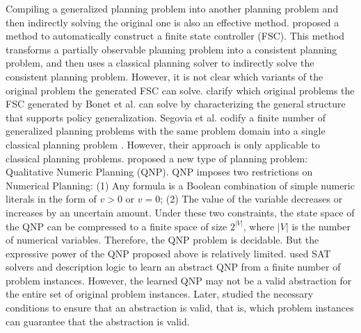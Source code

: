 \documentclass[review]{elsarticle}
\begin{document}
Compiling a generalized planning problem into another planning problem and then indirectly solving the original one is also an effective method.
\citet{BonPG2009} proposed a method to automatically construct a finite state controller (FSC). This method transforms a partially observable planning problem into a consistent planning problem, and then uses a classical planning solver to indirectly solve the consistent planning problem. 
However, it is not clear which variants of the original problem the generated FSC can solve. \citet{BonG2015} clarify which original problems the FSC generated by Bonet et al. \cite{BonPG2009} can solve by characterizing the general structure that supports policy generalization.
Segovia et al. 
codify a finite number of generalized planning problems with the same problem domain into a single classical planning problem \cite{SegJJ2016,SegJJ2019,SegJJ2021}. 
However, their approach is only applicable to classical planning problems. \citet{SriZIG2011} proposed a new type of planning problem: Qualitative Numeric Planning (QNP). 
QNP imposes two restrictions on Numerical Planning:
(1) Any formula is a Boolean combination of simple numeric literals in the form of $v > 0$ or $v = 0$; 
(2) The value of the variable decreases or increases by an uncertain amount. Under these two constraints, the state space of the QNP can be compressed to a finite space of size $2^{|V|}$, where $|V|$ is the number of numerical variables. 
Therefore, the QNP problem is decidable. 
But the expressive power of the QNP proposed above is relatively limited. \citet{BonFG2019} used SAT solvers and description logic to learn an abstract QNP from a finite number of problem instances. 
However, the learned QNP may not be a valid abstraction for the entire set of original problem instances. Later, \citet{BonFEB2019} studied the necessary conditions to ensure that an abstraction is valid, that is, which problem instances can guarantee that the abstraction is valid.

\end{document}

